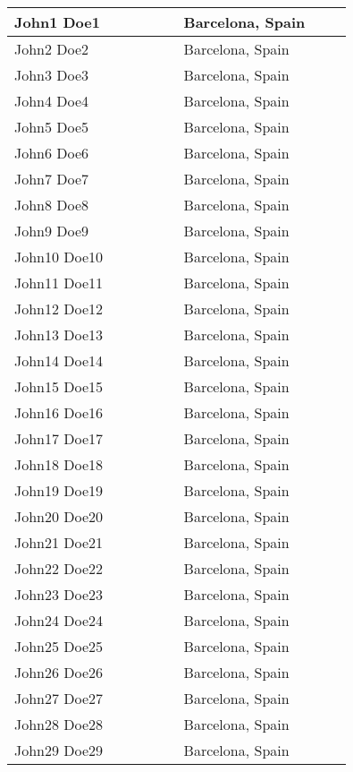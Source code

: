\begin{center}
\begin{longtable}{p{0.4\linewidth} p{0.4\linewidth} }
\hline
		John1 Doe1 & Barcelona, Spain \\ \hline
		John2 Doe2 & Barcelona, Spain \\ \hline
		John3 Doe3 & Barcelona, Spain \\ \hline
		John4 Doe4 & Barcelona, Spain \\ \hline
		John5 Doe5 & Barcelona, Spain \\ \hline
		John6 Doe6 & Barcelona, Spain \\ \hline
		John7 Doe7 & Barcelona, Spain \\ \hline
		John8 Doe8 & Barcelona, Spain \\ \hline
		John9 Doe9 & Barcelona, Spain \\ \hline
		John10 Doe10 & Barcelona, Spain \\ \hline
		John11 Doe11 & Barcelona, Spain \\ \hline
		John12 Doe12 & Barcelona, Spain \\ \hline
		John13 Doe13 & Barcelona, Spain \\ \hline
		John14 Doe14 & Barcelona, Spain \\ \hline
		John15 Doe15 & Barcelona, Spain \\ \hline
		John16 Doe16 & Barcelona, Spain \\ \hline
		John17 Doe17 & Barcelona, Spain \\ \hline
		John18 Doe18 & Barcelona, Spain \\ \hline
		John19 Doe19 & Barcelona, Spain \\ \hline
		John20 Doe20 & Barcelona, Spain \\ \hline
		John21 Doe21 & Barcelona, Spain \\ \hline
		John22 Doe22 & Barcelona, Spain \\ \hline
		John23 Doe23 & Barcelona, Spain \\ \hline
		John24 Doe24 & Barcelona, Spain \\ \hline
		John25 Doe25 & Barcelona, Spain \\ \hline
		John26 Doe26 & Barcelona, Spain \\ \hline
		John27 Doe27 & Barcelona, Spain \\ \hline
		John28 Doe28 & Barcelona, Spain \\ \hline
		John29 Doe29 & Barcelona, Spain \\ \hline
\end{longtable}
\end{center}